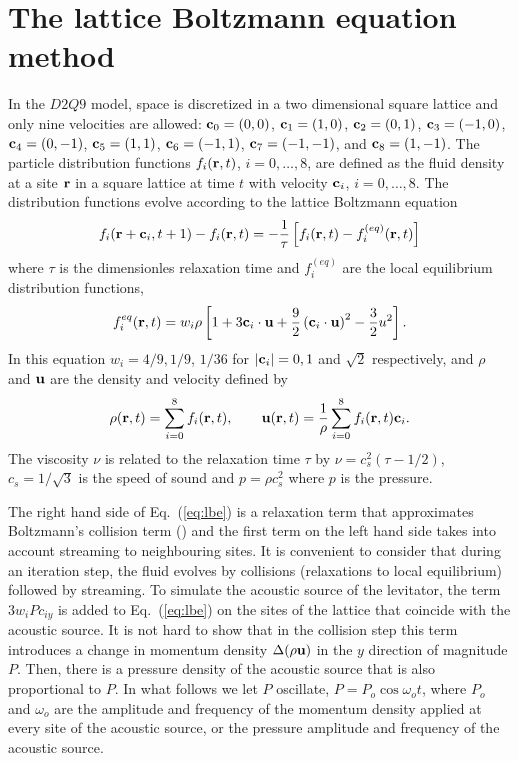 
\section{\label{sec:lbm} The lattice Boltzmann equation method}

In the $D2Q9$ model, space is discretized in a two dimensional square lattice and only nine 
velocities are
allowed: $\textbf c_0=(0,0)$, $\textbf c_1=(1,0)$, $\textbf c_2=(0,1)$, $\textbf c_3=(-1,0)$, $\textbf c_4=(0,-1)$, 
$\textbf c_5=(1,1)$, $\textbf c_6=(-1,1)$, $\textbf c_7=(-1,-1)$, and $\textbf c_8=(1,-1)$. The particle distribution
functions $f_i(\textbf r,t)$, $i=0,\dots,8$, are defined as the fluid density at a 
site $\textbf r$ in a square lattice at time $t$ with velocity $\textbf c_i$, $i=0,\dots,8$. 
The distribution functions evolve according to the lattice Boltzmann equation 
\begin{equation}
 \label{eq:lbe}
 f_i(\vr+\vc_i,t+1)-f_i(\vr ,t)=%
	-\dfrac{1}{\tau}\left[f_i(\vr ,t)-f_i^{(eq)}(\vr,t)\right]
\end{equation}
where $\tau$ is the dimensionles relaxation time and $f_i^{(eq)}$ 
are the local equilibrium distribution functions,
\begin{equation}
 \label{eq:fi-eq-ebr}
  f_i^{eq}(\vr,t)=w_i\rho\left[1+3\vc_i\cdot\vu+\dfrac{9}{2}\left(\vc_i\cdot\vu\right)^2-%
	\dfrac{3}{2}u^2\right].
\end{equation}
In this equation $w_i =4/9, 1/9$, $1/36$ for $|\textbf c_i |=0,1$ and $\sqrt 2$ respectively, and 
$\rho$ and $\textbf u$ are the density and velocity defined by 
\begin{equation}
 \label{eq:rho-u}
  \rho(\vr,t)=\sum_{i=0}^{8}f_i(\vr,t),\qquad%
	\vu(\vr,t)=\dfrac{1}{\rho}\sum_{i=0}^{8}f_i(\vr,t)\vc_i.
\end{equation}
The viscosity $\nu$ is related to the relaxation time $\tau$ by $\nu =c^2_s (\tau -1/2)$,
$c_s =1/\sqrt 3$ is the speed of sound and $p=\rho c_s^2$ where $p$ is the pressure.

The right hand side of Eq.~(\ref{eq:lbe}) is a relaxation term that approximates Boltzmann's
collision term (\cite{bgk54}) and the first term on the left hand side takes into 
account streaming to neighbouring sites. It is convenient to consider that during 
an iteration step, the fluid evolves by collisions (relaxations to local equilibrium)
followed by streaming. To simulate the acoustic source of the levitator, the term 
$3w_i P c_{iy}$ is added to Eq.~(\ref{eq:lbe}) on the sites of the lattice that coincide 
with the acoustic source. It is not hard to show that in the collision step this term 
introduces a change in momentum density $\Delta(\rho\textbf u)$ in the $y$ direction 
of magnitude $P$. 
Then, there is a pressure density of the acoustic source that is also proportional to
$P$. In what follows we let $P$ oscillate, $P=P_o\cos \omega_o t$, where 
$P_o$ and $\omega_o$ are the amplitude and frequency of the momentum density applied 
at every site of the acoustic source, or the pressure amplitude and frequency of the 
acoustic source.

